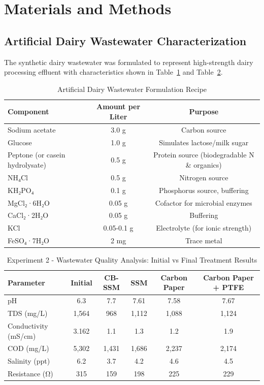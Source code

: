 \documentclass[12pt,a4paper]{article}
\begin{document}
\section{Materials and Methods}

\subsection{Artificial Dairy Wastewater Characterization}

The synthetic dairy wastewater was formulated to represent high-strength dairy processing effluent with characteristics shown in Table~\ref{tab:wastewater_recipe} and Table~\ref{tab:wastewater_params}.

\begin{table}[htbp]
\centering
\caption{Artificial Dairy Wastewater Formulation Recipe}
\label{tab:wastewater_recipe}
\begin{tabular}{@{}lcc@{}}
\toprule
\textbf{Component} & \textbf{Amount per Liter} & \textbf{Purpose} \\
\midrule
Sodium acetate & 3.0 g & Carbon source \\
Glucose & 1.0 g & Simulates lactose/milk sugar \\
Peptone (or casein hydrolysate) & 0.5 g & Protein source (biodegradable N \& organics) \\
NH₄Cl & 0.5 g & Nitrogen source \\
KH₂PO₄ & 0.1 g & Phosphorus source, buffering \\
MgCl₂·6H₂O & 0.05 g & Cofactor for microbial enzymes \\
CaCl₂·2H₂O & 0.05 g & Buffering \\
KCl & 0.05-0.1 g & Electrolyte (for ionic strength) \\
FeSO₄·7H₂O & 2 mg & Trace metal \\
\bottomrule
\end{tabular}
\end{table}

\begin{table}[htbp]
\centering
\caption{Experiment 2 - Wastewater Quality Analysis: Initial vs Final Treatment Results}
\label{tab:wastewater_params}
\begin{tabular}{@{}lccccc@{}}
\toprule
\textbf{Parameter} & \textbf{Initial} & \textbf{CB-SSM} & \textbf{SSM} & \textbf{Carbon Paper} & \textbf{Carbon Paper + PTFE} \\
\midrule
pH & 6.3 & 7.7 & 7.61 & 7.58 & 7.67 \\
TDS (mg/L) & 1,564 & 968 & 1,112 & 1,088 & 1,124 \\
Conductivity (mS/cm) & 3.162 & 1.1 & 1.3 & 1.2 & 1.9 \\
COD (mg/L) & 5,302 & 1,431 & 1,686 & 2,237 & 2,174 \\
Salinity (ppt) & 6.2 & 3.7 & 4.2 & 4.6 & 4.5 \\
Resistance (Ω) & 315 & 159 & 198 & 225 & 229 \\
\bottomrule
\end{tabular}
\end{table}
\end{document}
